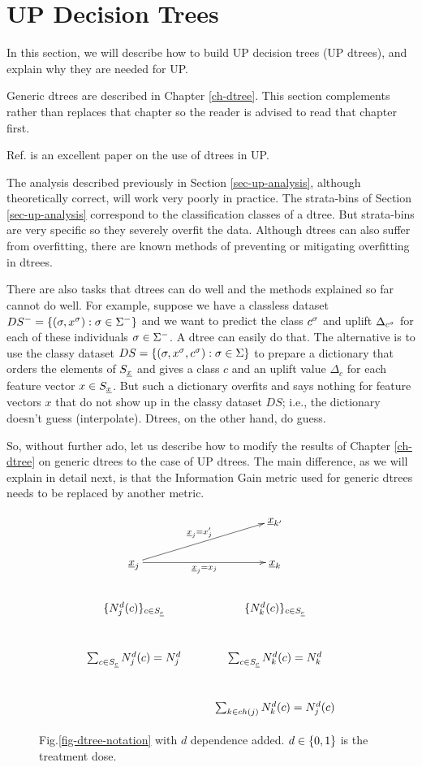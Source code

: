 \section{UP Decision Trees}

In this section,
we will describe
how to build UP decision trees (UP dtrees),
and explain why they are needed
for UP.

Generic dtrees are 
described in Chapter \ref{ch-dtree}.
This section 
complements rather than replaces
that chapter so the reader
is advised to read
that chapter first.

Ref.\cite{jaros} is an excellent paper on the use of
dtrees in UP.


The
analysis described
previously in  
Section
\ref{sec-up-analysis},
although theoretically correct,
will work very poorly in practice.
The strata-bins
of Section
\ref{sec-up-analysis}
correspond to
the classification
classes of a dtree.
But strata-bins are very
specific so they  
severely overfit the data.
Although dtrees 
can also suffer from overfitting,
there are known methods of 
preventing or mitigating overfitting in dtrees.

There are also tasks 
that dtrees 
can do well
and the methods
explained so far
cannot do well.
For example,
suppose we have 
a classless
dataset $DS^-=\{(\sigma, x^\sigma):\sigma\in \Sigma^-\}$
and we want to predict
the class $c^\sigma$ and
uplift $\Delta_{c^\sigma}$
for each of these individuals 
$\sigma\in \Sigma^-$.
A dtree can easily
do that. The alternative
is to use the classy dataset 
$DS=\{(\sigma, x^\sigma, c^\sigma):\sigma\in \Sigma\}$
to
prepare a dictionary
that orders
the elements
of $S_{\underline{x}}$ and gives a
class $c$ and an uplift value
$\Delta_c$ for each
feature vector $x\in S_{\underline{x}}$.
But
such a dictionary overfits
and says nothing for 
feature vectors $x$
that do not show up in 
the classy dataset $DS$; i.e., the
dictionary 
doesn't guess (interpolate). Dtrees,
on the other hand, do
guess.

So, without further ado,
let us describe how to
modify the results
of Chapter \ref{ch-dtree}
on generic dtrees
to the case of UP dtrees.
The main difference,
as we will
explain in detail
next,
is that the Information
Gain metric
used for generic dtrees
needs to be replaced
by another metric.






\begin{figure}[h!]
$$
\xymatrix{
&\rvx_{k'}
\\
\rvx_j\ar[r]_{\rvx_j=x_j}
\ar[ru]^{\rvx_j=x_j'}&\rvx_k
\\
\{N^d_j(c)\}_{c\in S_\rvc}
&
\{N^d_k(c)\}_{c\in S_\rvc}
\\
\sum_{c\in S_\rvc}N^d_j(c)=N^d_j
&
\sum_{c\in S_\rvc}N^d_k(c)=N^d_k
\\
&
\sum_{k\in ch(j)}N^d_k(c)=N^d_j(c)
}
$$
\caption{Fig.\ref{fig-dtree-notation}
 with $d$ dependence added.
$d\in \{0,1\}$
is the treatment dose.
} 
\label{fig-dtree-notation-uplift}
\end{figure}

